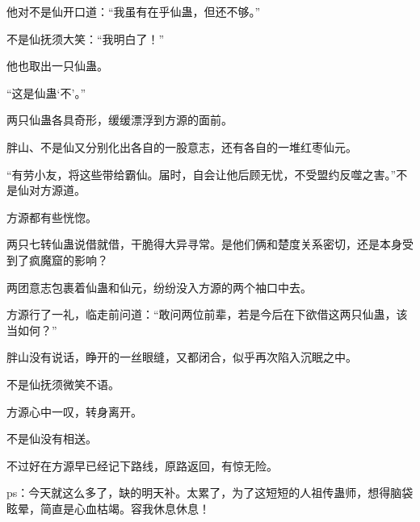 \begin{this_body}
他对不是仙开口道：“我虽有在乎仙蛊，但还不够。”

不是仙抚须大笑：“我明白了！”

他也取出一只仙蛊。

“这是仙蛊‘不’。”

两只仙蛊各具奇形，缓缓漂浮到方源的面前。

胖山、不是仙又分别化出各自的一股意志，还有各自的一堆红枣仙元。

“有劳小友，将这些带给霸仙。届时，自会让他后顾无忧，不受盟约反噬之害。”不是仙对方源道。

方源都有些恍惚。

两只七转仙蛊说借就借，干脆得大异寻常。是他们俩和楚度关系密切，还是本身受到了疯魔窟的影响？

两团意志包裹着仙蛊和仙元，纷纷没入方源的两个袖口中去。

方源行了一礼，临走前问道：“敢问两位前辈，若是今后在下欲借这两只仙蛊，该当如何？”

胖山没有说话，睁开的一丝眼缝，又都闭合，似乎再次陷入沉眠之中。

不是仙抚须微笑不语。

方源心中一叹，转身离开。

不是仙没有相送。

不过好在方源早已经记下路线，原路返回，有惊无险。

ps：今天就这么多了，缺的明天补。太累了，为了这短短的人祖传蛊师，想得脑袋眩晕，简直是心血枯竭。容我休息休息！

\end{this_body}

